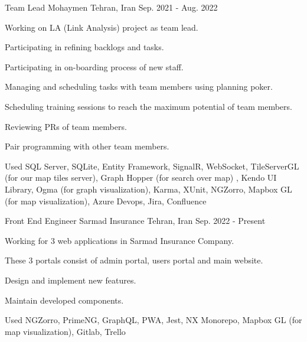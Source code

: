 \begin{cventries}
  \cventry
    {Team Lead} %
    {Mohaymen} %
    {Tehran, Iran} %
    {Sep. 2021 - Aug. 2022} %
    {
    	\begin{cvitems} %
    		\item {Working on LA (Link Analysis) project as team lead.}
    		\item {Participating in refining backlogs and tasks.}
    		\item {Participating in on-boarding process of new staff.}
    		\item {Managing and scheduling tasks with team members using planning poker.}
    		\item {Scheduling training sessions to reach the maximum potential of team members.}
    		\item {Reviewing PRs of team members.}
    		\item {Pair programming with other team members.}
    		\item {Used SQL Server, SQLite, Entity Framework, SignalR, WebSocket, TileServerGL (for our map tiles server), Graph Hopper (for search over map) , Kendo UI Library, Ogma (for graph visualization), Karma, XUnit, NGZorro, Mapbox GL (for map visualization), Azure Devops, Jira, Confluence}
    	\end{cvitems}
    }

  \cventry
    {Front End Engineer} %
    {Sarmad Insurance} %
    {Tehran, Iran} %
    {Sep. 2022 - Present} %
    {
      \begin{cvitems} %
      	\item {Working for 3 web applications in Sarmad Insurance Company.}
      	\item {These 3 portals consist of admin portal, users portal and main website.}
        \item {Design and implement new features.}
        \item {Maintain developed components.}
        \item {Used NGZorro, PrimeNG, GraphQL, PWA, Jest, NX Monorepo, Mapbox GL (for map visualization), Gitlab, Trello}
      \end{cvitems}
    }




\end{cventries}
